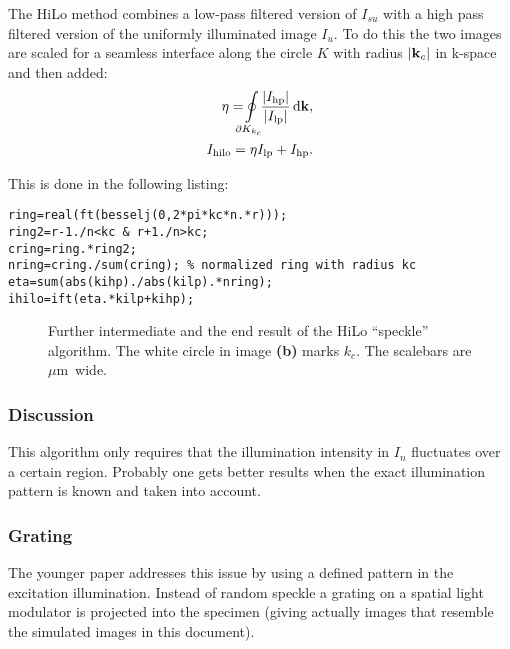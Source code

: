 \documentclass[11pt]{scrartcl}
\newcommand{\abs}[1]{\left| #1 \right|}
\renewcommand{\v }[1]{{\bf #1}}
\begin{document}
The HiLo method combines a low-pass filtered version of $I_{su}$ with
a high pass filtered version of the uniformly illuminated image $I_u$.
To do this the two images are scaled for a seamless interface along
the circle $K$ with radius $\abs{\v k_c}$ in k-space and then added:
\begin{align}
  \eta=\!\!\!\!\ointop_{\partial K_{k_c}}\!\!\!
  \frac{\abs{I_\textrm{hp}}}{\abs{I_\textrm{lp}}}\,\textrm{d}\v k,\\
  I_\textrm{hilo}=\eta I_\textrm{lp}+I_\textrm{hp}.
\end{align}

This is done in the following listing:
\begin{lstlisting}
ring=real(ft(besselj(0,2*pi*kc*n.*r)));
ring2=r-1./n<kc & r+1./n>kc;
cring=ring.*ring2;
nring=cring./sum(cring); % normalized ring with radius kc
eta=sum(abs(kihp)./abs(kilp).*nring);
ihilo=ift(eta.*kilp+kihp);
\end{lstlisting}

\begin{figure}[htb]
  \centering
  \caption{Further intermediate and the end result of the HiLo ``speckle'' algorithm. The white circle in image {\bf (b)} marks $k_c$. The scalebars are \unit[2]{$\mu$m} wide.}
  \label{fig:hilo1interm2}
\end{figure}

\subsubsection*{Discussion}
This algorithm only requires that the illumination intensity in $I_n$
fluctuates over a certain region. Probably one gets better results
when the exact illumination pattern is known and taken into account.

\subsubsection{Grating}
The younger paper \cite{2009Santos} addresses this issue by using a
defined pattern in the excitation illumination. Instead of random
speckle a grating on a spatial light modulator is projected into the
specimen (giving actually images that resemble the simulated images in
this document).
\end{document}
